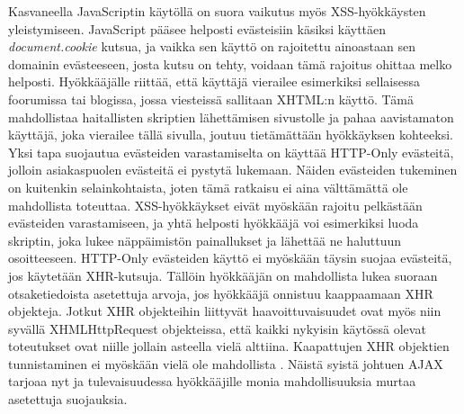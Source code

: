 Kasvaneella JavaScriptin käytöllä on suora vaikutus myös XSS-hyökkäysten yleistymiseen. JavaScript pääsee helposti evästeisiin käsiksi käyttäen \emph{document.cookie} kutsua, ja vaikka sen 
käyttö on rajoitettu ainoastaan sen domainin evästeeseen, josta kutsu on tehty, voidaan tämä rajoitus ohittaa melko helposti. Hyökkääjälle riittää, että käyttäjä vierailee esimerkiksi sellaisessa
foorumissa tai blogissa, jossa viesteissä sallitaan XHTML:n käyttö. Tämä mahdollistaa haitallisten skriptien lähettämisen sivustolle ja pahaa aavistamaton käyttäjä, joka vierailee tällä
sivulla, joutuu tietämättään hyökkäyksen kohteeksi. Yksi tapa suojautua evästeiden varastamiselta on käyttää HTTP-Only evästeitä, jolloin asiakaspuolen evästeitä ei pystytä lukemaan. Näiden
evästeiden tukeminen on kuitenkin selainkohtaista, joten tämä ratkaisu ei aina välttämättä ole mahdollista toteuttaa. XSS-hyökkäykset eivät myöskään rajoitu pelkästään evästeiden varastamiseen,
ja yhtä helposti hyökkääjä voi esimerkiksi luoda skriptin, joka lukee näppäimistön painallukset ja lähettää ne haluttuun osoitteeseen. HTTP-Only evästeiden käyttö ei myöskään täysin suojaa 
evästeitä, jos käytetään XHR-kutsuja. Tällöin hyökkääjän on mahdollista lukea suoraan otsaketiedoista asetettuja arvoja, jos hyökkääjä onnistuu kaappaamaan XHR objekteja. Jotkut XHR objekteihin
liittyvät haavoittuvaisuudet ovat myös niin syvällä XHMLHttpRequest objekteissa, että kaikki nykyisin käytössä olevat toteutukset ovat niille jollain asteella vielä alttiina. Kaapattujen XHR 
objektien tunnistaminen ei myöskään vielä ole mahdollista \cite{AJAX}. Näistä syistä johtuen AJAX tarjoaa nyt ja tulevaisuudessa hyökkääjille monia mahdollisuuksia murtaa asetettuja suojauksia.

